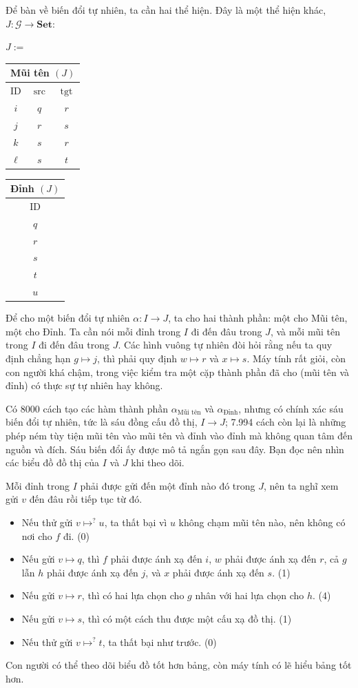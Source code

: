 Để bàn về biến đổi tự nhiên, ta cần hai thể hiện. Đây là một thể hiện khác, $J:\mathcal G\to\mathbf{Set}$:
\begin{center}$J:=$\ctfiveGraphJ\end{center}
\begin{center}\begin{tabular}{|c|c|c|}\hline\multicolumn{3}{|c|}{Mũi tên $(J)$}\\\hline ID&$\operatorname{src}$&$\operatorname{tgt}$\\\hline$i$&$q$&$r$\\$j$&$r$&$s$\\$k$&$s$&$r$\\$\ell$&$s$&$t$\\\hline\end{tabular}\qquad\begin{tabular}{|c|}\hline Đỉnh $(J)$\\\hline ID\\\hline$q$\\$r$\\$s$\\$t$\\$u$\\\hline\end{tabular}\end{center}
Để cho một biến đổi tự nhiên $\alpha:I\to J$, ta cho hai thành phần: một cho Mũi tên, một cho Đỉnh. Ta cần nói mỗi đỉnh trong $I$ đi đến đâu trong $J$, và mỗi mũi tên trong $I$ đi đến đâu trong $J$. Các hình vuông tự nhiên đòi hỏi rằng nếu ta quy định chẳng hạn $g\mapsto j$, thì phải quy định $w\mapsto r$ và $x\mapsto s$. Máy tính rất giỏi, còn con người khá chậm, trong việc kiểm tra một cặp thành phần đã cho (mũi tên và đỉnh) có thực sự tự nhiên hay không.

Có 8000 cách tạo các hàm thành phần $\alpha_{\text{Mũi tên}}$ và $\alpha_{\text{Đỉnh}}$, nhưng có chính xác sáu biến đổi tự nhiên, tức là sáu đồng cấu đồ thị, $I\to J$; 7.994 cách còn lại là những phép ném tùy tiện mũi tên vào mũi tên và đỉnh vào đỉnh mà không quan tâm đến nguồn và đích. Sáu biến đổi ấy được mô tả ngắn gọn sau đây. Bạn đọc nên nhìn các biểu đồ đồ thị của $I$ và $J$ khi theo dõi.

Mỗi đỉnh trong $I$ phải được gửi đến một đỉnh nào đó trong $J$, nên ta nghĩ xem gửi $v$ đến đâu rồi tiếp tục từ đó.
\begin{itemize}
\item Nếu thử gửi $v\mapsto^{?}u$, ta thất bại vì $u$ không chạm mũi tên nào, nên không có nơi cho $f$ đi. (0)
\item Nếu gửi $v\mapsto q$, thì $f$ phải được ánh xạ đến $i$, $w$ phải được ánh xạ đến $r$, cả $g$ lẫn $h$ phải được ánh xạ đến $j$, và $x$ phải được ánh xạ đến $s$. (1)
\item Nếu gửi $v\mapsto r$, thì có hai lựa chọn cho $g$ nhân với hai lựa chọn cho $h$. (4)
\item Nếu gửi $v\mapsto s$, thì có một cách thu được một cấu xạ đồ thị. (1)
\item Nếu thử gửi $v\mapsto^{?}t$, ta thất bại như trước. (0)
\end{itemize}
Con người có thể theo dõi biểu đồ tốt hơn bảng, còn máy tính có lẽ hiểu bảng tốt hơn.
